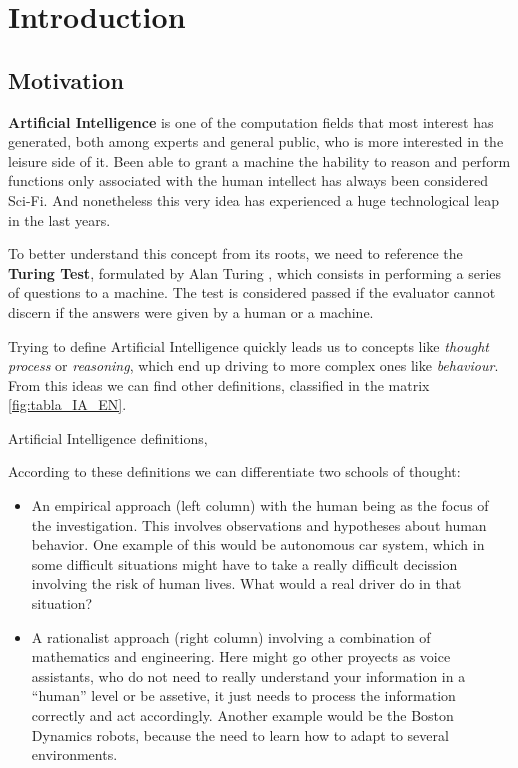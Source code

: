 \chapter{Introduction}



\section{Motivation}

\textbf{Artificial Intelligence} is one of the computation fields that most interest has generated, both among experts and general public, who is more interested in the leisure side of it. Been able to grant a machine the hability to reason and perform functions only associated with the human intellect has always been considered Sci-Fi. And nonetheless this very idea has experienced a huge technological leap in the last years.

To better understand this concept from its roots, we need to reference the \textbf{Turing Test}, formulated by Alan Turing \citep{Turing1950-TURCMA}, which consists in performing a series of questions to a machine. The test is considered passed if the evaluator cannot discern if the answers were given by a human or a machine.

Trying to define Artificial Intelligence quickly leads us to concepts like \textit{thought process} or \textit{reasoning}, which end up driving to more complex ones like \textit{behaviour}. From this ideas we can find other definitions, classified in the matrix \ref{fig:tabla_IA_EN}.

%
       {Artificial Intelligence definitions, \citet{Russell:2009:AIM:1671238}}

According to these definitions we can differentiate two schools of thought:
\begin{itemize}
    \item An empirical approach (left column) with the human being as the focus of the investigation. This involves observations and hypotheses about human behavior. One example of this would be autonomous car system, which in some difficult situations might have to take a really difficult decission involving the risk of human lives. What would a real driver do in that situation?
    \item A rationalist approach (right column) involving a combination of mathematics and engineering. Here might go other proyects as voice assistants, who do not need to really understand your information in a ``human'' level or be assetive, it just needs to process the information correctly and act accordingly. Another example would be the Boston Dynamics robots, because the need to learn how to adapt to several environments.
\end{itemize}

